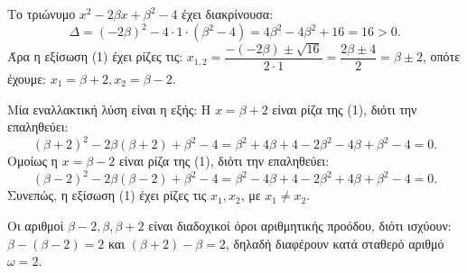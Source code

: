 
\begin{alist}
\item Το τριώνυμο $x^2 - 2\beta x + \beta^2 - 4$ έχει διακρίνουσα:
\[\Delta = (-2\beta)^2 - 4 \cdot 1 \cdot (\beta^2 - 4) = 4\beta^2 - 4\beta^2 + 16 = 16 > 0.\]
Άρα η εξίσωση (1) έχει ρίζες τις:
$x_{1,2} = \dfrac{-(-2\beta) \pm \sqrt{16}}{2 \cdot 1} = \dfrac{2\beta \pm 4}{2} = \beta \pm 2$, οπότε έχουμε: $x_1 = \beta + 2, x_2 = \beta - 2$.

Μία εναλλακτική λύση είναι η εξής:
Η $x = \beta + 2$ είναι ρίζα της (1), διότι την επαληθεύει:
\[(\beta + 2)^2 - 2\beta(\beta + 2) + \beta^2 - 4 = \beta^2 + 4\beta + 4 - 2\beta^2 - 4\beta + \beta^2 - 4 = 0.\]
Ομοίως η $x = \beta - 2$ είναι ρίζα της (1), διότι την επαληθεύει:
\[(\beta - 2)^2 - 2\beta(\beta - 2) + \beta^2 - 4 = \beta^2 - 4\beta + 4 - 2\beta^2 + 4\beta + \beta^2 - 4 = 0.\]
Συνεπώς, η εξίσωση (1) έχει ρίζες τις $x_1, x_2$, με $x_1 \ne x_2$.

\item Οι αριθμοί $\beta - 2, \beta, \beta + 2$ είναι διαδοχικοί όροι αριθμητικής προόδου, διότι ισχύουν:
$\beta - (\beta - 2) = 2$ και
$(\beta + 2) - \beta = 2$, δηλαδή διαφέρουν κατά σταθερό αριθμό $\omega = 2$.
\end{alist}

